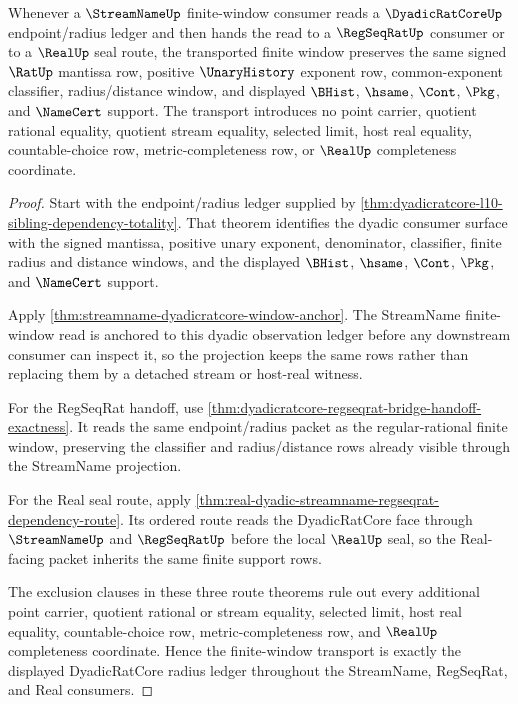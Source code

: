 \begin{theorem}
\label{thm:dyadicratcore-streamname-finite-window-radius-transport}
Whenever a $\StreamNameUp$ finite-window consumer reads a $\DyadicRatCoreUp$
endpoint/radius ledger and then hands the read to a $\RegSeqRatUp$ consumer or
to a $\RealUp$ seal route, the transported finite window preserves the same
signed $\RatUp$ mantissa row, positive $\UnaryHistory$ exponent row,
common-exponent classifier, radius/distance window, and displayed $\BHist$,
$\hsame$, $\Cont$, $\Pkg$, and $\NameCert$ support. The transport introduces
no point carrier, quotient rational equality, quotient stream equality,
selected limit, host real equality, countable-choice row, metric-completeness
row, or $\RealUp$ completeness coordinate.
\end{theorem}
\begin{proof}
Start with the endpoint/radius ledger supplied by
\autoref{thm:dyadicratcore-l10-sibling-dependency-totality}. That theorem
identifies the dyadic consumer surface with the signed mantissa, positive unary
exponent, denominator, classifier, finite radius and distance windows, and the
displayed $\BHist$, $\hsame$, $\Cont$, $\Pkg$, and $\NameCert$ support.

Apply \autoref{thm:streamname-dyadicratcore-window-anchor}. The StreamName
finite-window read is anchored to this dyadic observation ledger before any
downstream consumer can inspect it, so the projection keeps the same rows rather
than replacing them by a detached stream or host-real witness.

For the RegSeqRat handoff, use
\autoref{thm:dyadicratcore-regseqrat-bridge-handoff-exactness}. It reads the
same endpoint/radius packet as the regular-rational finite window, preserving
the classifier and radius/distance rows already visible through the StreamName
projection.

For the Real seal route, apply
\autoref{thm:real-dyadic-streamname-regseqrat-dependency-route}. Its ordered
route reads the DyadicRatCore face through $\StreamNameUp$ and $\RegSeqRatUp$
before the local $\RealUp$ seal, so the Real-facing packet inherits the same
finite support rows.

The exclusion clauses in these three route theorems rule out every additional
point carrier, quotient rational or stream equality, selected limit, host real
equality, countable-choice row, metric-completeness row, and $\RealUp$
completeness coordinate. Hence the finite-window transport is exactly the
displayed DyadicRatCore radius ledger throughout the StreamName, RegSeqRat, and
Real consumers.
\end{proof}
